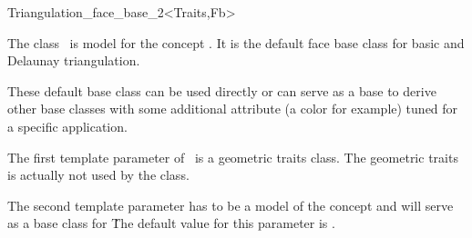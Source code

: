 

\begin{ccRefClass}{Triangulation_face_base_2<Traits,Fb>}  %

\ccDefinition
  
The class \ccRefName\ is model for the concept
. It is the default face base class
for basic and Delaunay triangulation.

These default base class can be used directly or can serve as a base to derive
other base classes with some additional attribute (a color for example)
tuned for a specific application.


\ccParameters
The first template parameter of \ccRefName\ is  a geometric traits class.
The geometric traits is actually not used by the class.

The second template parameter 
has to be a  model of the concept 
and will serve as a base class for \ccRefName\.
The default value for this parameter is
.



\ccIsModel
{}

\ccSeeAlso
{}\\
\\



\end{ccRefClass}


